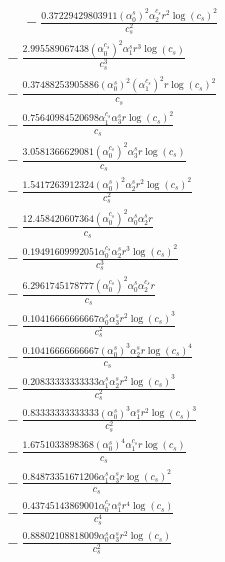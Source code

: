 \documentclass[10pt]{article}
\begin{document}
\begin{align*}
\phantom{R_{2,7}} &\phantom{={}}{}  - \frac{0.37229429803911 \left(\alpha_{0}^s\right)^{2} \alpha_{2}^{c_s} r^{2} \log{\left(c_{s} \right)}^{2}}{c_{s}^{2}} \\
&{}  - \frac{2.995589067438 \left(\alpha_{0}^{c_s}\right)^{2} \alpha_{1}^s r^{3} \log{\left(c_{s} \right)}}{c_{s}^{3}} \\
&{}  - \frac{0.37488253905886 \left(\alpha_{0}^s\right)^{2} \left(\alpha_{1}^{c_s}\right)^{2} r \log{\left(c_{s} \right)}^{2}}{c_{s}} \\
&{}  - \frac{0.75640984520698 \alpha_{1}^{c_s} \alpha_{3}^s r \log{\left(c_{s} \right)}^{2}}{c_{s}} \\
&{}  - \frac{3.0581366629081 \left(\alpha_{0}^{c_s}\right)^{2} \alpha_{3}^s r \log{\left(c_{s} \right)}}{c_{s}} \\
&{}  - \frac{1.5417263912324 \left(\alpha_{0}^s\right)^{2} \alpha_{2}^s r^{2} \log{\left(c_{s} \right)}^{2}}{c_{s}^{2}} \\
&{}  - \frac{12.458420607364 \left(\alpha_{0}^{c_s}\right)^{2} \alpha_{0}^s \alpha_{2}^s r}{c_{s}} \\
&{}  - \frac{0.19491609992051 \alpha_{0}^{c_s} \alpha_{2}^s r^{3} \log{\left(c_{s} \right)}^{2}}{c_{s}^{3}} \\
&{}  - \frac{6.2961745178777 \left(\alpha_{0}^{c_s}\right)^{2} \alpha_{0}^s \alpha_{2}^{c_s} r}{c_{s}} \\
&{}  - \frac{0.10416666666667 \alpha_{0}^s \alpha_{3}^s r^{2} \log{\left(c_{s} \right)}^{3}}{c_{s}^{2}} \\
&{}  - \frac{0.10416666666667 \left(\alpha_{0}^s\right)^{3} \alpha_{2}^s r \log{\left(c_{s} \right)}^{4}}{c_{s}} \\
&{}  - \frac{0.20833333333333 \alpha_{1}^s \alpha_{2}^s r^{2} \log{\left(c_{s} \right)}^{3}}{c_{s}^{2}} \\
&{}  - \frac{0.83333333333333 \left(\alpha_{0}^s\right)^{3} \alpha_{1}^s r^{2} \log{\left(c_{s} \right)}^{3}}{c_{s}^{2}} \\
&{}  - \frac{1.6751033898368 \left(\alpha_{0}^s\right)^{4} \alpha_{1}^{c_s} r \log{\left(c_{s} \right)}}{c_{s}} \\
&{}  - \frac{0.84873351671206 \alpha_{1}^s \alpha_{3}^s r \log{\left(c_{s} \right)}^{2}}{c_{s}} \\
&{}  - \frac{0.43745143869001 \alpha_{0}^{c_s} \alpha_{1}^s r^{4} \log{\left(c_{s} \right)}}{c_{s}^{4}} \\
&{}  - \frac{0.88802108818009 \alpha_{0}^s \alpha_{3}^s r^{2} \log{\left(c_{s} \right)}}{c_{s}^{2}} \\

\end{align*}
\end{document}
